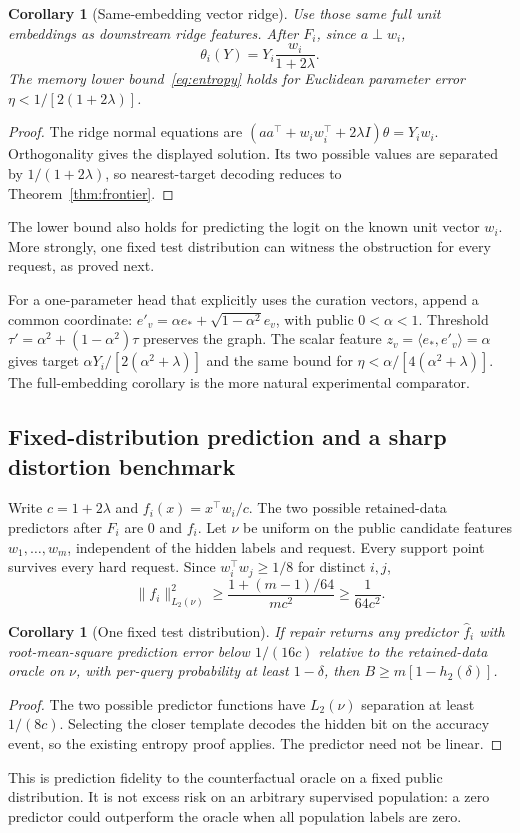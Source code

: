 \documentclass[11pt,a4paper]{article}
\newtheorem{corollary}[theorem]{Corollary}
\theoremstyle{definition}\newtheorem{definition}[theorem]{Definition}
\begin{document}
\begin{corollary}[Same-embedding vector ridge]\label{cor:shared}
Use those same full unit embeddings as downstream ridge features. After $F_i$, since $a\perp w_i$,
\[
 \theta_i(Y)=Y_i\frac{w_i}{1+2\lambda}.
\]
The memory lower bound~\eqref{eq:entropy} holds for Euclidean parameter error $\eta<1/[2(1+2\lambda)]$.
\end{corollary}
\begin{proof}
The ridge normal equations are $(aa^\top+w_iw_i^\top+2\lambda I)\theta=Y_iw_i$. Orthogonality gives the displayed solution. Its two possible values are separated by $1/(1+2\lambda)$, so nearest-target decoding reduces to Theorem~\ref{thm:frontier}.
\end{proof}
The lower bound also holds for predicting the logit on the known unit vector $w_i$. More strongly, one fixed test distribution can witness the obstruction for every request, as proved next.

For a one-parameter head that explicitly uses the curation vectors, append a common coordinate: $e'_v=\alpha e_*+\sqrt{1-\alpha^2}e_v$, with public $0<\alpha<1$. Threshold $\tau'=\alpha^2+(1-\alpha^2)\tau$ preserves the graph. The scalar feature $z_v=\langle e_*,e'_v\rangle=\alpha$ gives target $\alpha Y_i/[2(\alpha^2+\lambda)]$ and the same bound for $\eta<\alpha/[4(\alpha^2+\lambda)]$. The full-embedding corollary is the more natural experimental comparator.

\subsection{Fixed-distribution prediction and a sharp distortion benchmark}
Write $c=1+2\lambda$ and $f_i(x)=x^\top w_i/c$. The two possible retained-data predictors after $F_i$ are $0$ and $f_i$. Let $\nu$ be uniform on the public candidate features $w_1,\ldots,w_m$, independent of the hidden labels and request. Every support point survives every hard request. Since $w_i^\top w_j\ge1/8$ for distinct $i,j$,
\[
 \|f_i\|_{L_2(\nu)}^2\ge\frac{1+(m-1)/64}{mc^2}\ge\frac1{64c^2}.
\]
\begin{corollary}[One fixed test distribution]\label{cor:prediction}
If repair returns any predictor $\widehat f_i$ with root-mean-square prediction error below $1/(16c)$ relative to the retained-data oracle on $\nu$, with per-query probability at least $1-\delta$, then $B\ge m[1-h_2(\delta)]$.
\end{corollary}
\begin{proof}
The two possible predictor functions have $L_2(\nu)$ separation at least $1/(8c)$. Selecting the closer template decodes the hidden bit on the accuracy event, so the existing entropy proof applies. The predictor need not be linear.
\end{proof}
This is prediction fidelity to the counterfactual oracle on a fixed public distribution. It is not excess risk on an arbitrary supervised population: a zero predictor could outperform the oracle when all population labels are zero.
\end{document}

